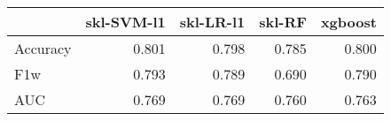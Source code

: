 \begin{tabular}{lrrrr}
\toprule
{} &  skl-SVM-l1 &  skl-LR-l1 &  skl-RF &  xgboost \\
\midrule
Accuracy &       0.801 &      0.798 &   0.785 &    0.800 \\
F1w      &       0.793 &      0.789 &   0.690 &    0.790 \\
AUC      &       0.769 &      0.769 &   0.760 &    0.763 \\
\bottomrule
\end{tabular}
